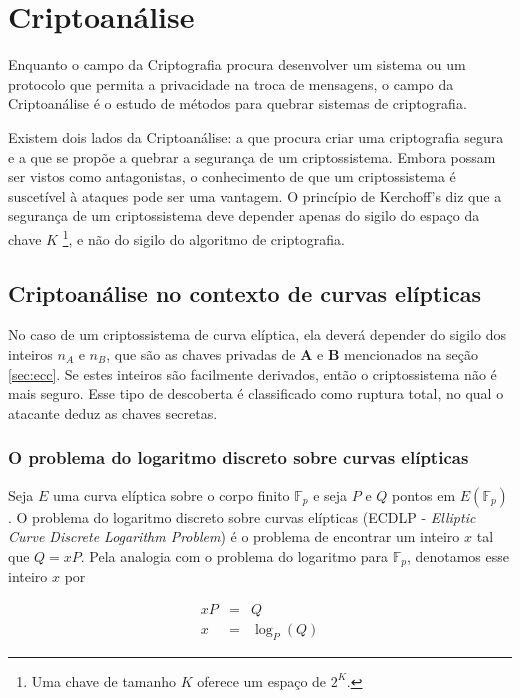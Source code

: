 %
%
\chapter{Criptoanálise}
Enquanto o campo da Criptografia procura desenvolver um sistema ou um protocolo que permita a privacidade na troca de mensagens, o campo da Criptoanálise é o estudo de métodos para quebrar sistemas de criptografia.

Existem dois lados da Criptoanálise: a que procura criar uma criptografia segura e a que se propõe a quebrar a segurança de um criptossistema. Embora possam ser vistos como antagonistas, o conhecimento de que um criptossistema é suscetível à ataques pode ser uma vantagem. O princípio de Kerchoff's diz que a segurança de um criptossistema deve depender apenas do sigilo do espaço da chave \(K\) \footnote{Uma chave de tamanho \(K\) oferece um espaço de \(2^K\).}, e não do sigilo do algoritmo de criptografia. \cite{Mandy:2007}

%
%
\section{Criptoanálise no contexto de curvas elípticas}
No caso de um criptossistema de curva elíptica, ela deverá depender do sigilo dos inteiros \(n_A\) e \(n_B\), que são as chaves privadas de \textbf{A} e \textbf{B} mencionados na seção \ref{sec:ecc}. Se estes inteiros são facilmente derivados, então o criptossistema não é mais seguro. Esse tipo de descoberta é classificado como ruptura total, no qual o atacante deduz as chaves secretas. \cite{Knudsen:1998}

%
%
\subsection{O problema do logaritmo discreto sobre curvas elípticas} \label{ecdpl}
Seja \(E\) uma curva elíptica sobre o corpo finito $\mathbb{F}_p$ e seja \(P\) e \(Q\) pontos em $E(\mathbb{F}_p)$. O problema do logaritmo discreto sobre curvas elípticas (ECDLP - \textit{Elliptic Curve Discrete Logarithm Problem}) é o problema de encontrar um inteiro \(x\) tal que $Q = xP$. Pela analogia com o problema do logaritmo para $\mathbb{F}_p$, denotamos esse inteiro \(x\) por

\begin{eqnarray}
xP &=& Q \label{eq:ecdpl1} \\
x &=& \log_P(Q) \label{eq:ecdpl2}
\end{eqnarray}

